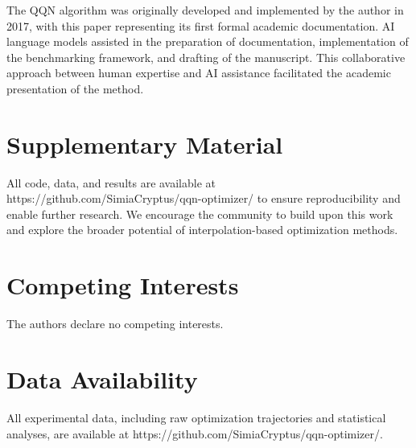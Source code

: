 The QQN algorithm was originally developed and implemented by the author in 2017, with this paper representing its first formal academic documentation.
AI language models assisted in the preparation of documentation, implementation of the benchmarking framework, and drafting of the manuscript.
This collaborative approach between human expertise and AI assistance facilitated the academic presentation of the method.

\hypertarget{supplementary-material}{%
\section{Supplementary Material}\label{supplementary-material}}

All code, data, and results are available at https://github.com/SimiaCryptus/qqn-optimizer/ to ensure reproducibility and enable further research.
We encourage the community to build upon this work and explore the broader potential of interpolation-based optimization methods.

\hypertarget{competing-interests}{%
\section{Competing Interests}\label{competing-interests}}

The authors declare no competing interests.

\hypertarget{data-availability}{%
\section{Data Availability}\label{data-availability}}

All experimental data, including raw optimization trajectories and statistical analyses, are available at https://github.com/SimiaCryptus/qqn-optimizer/.
